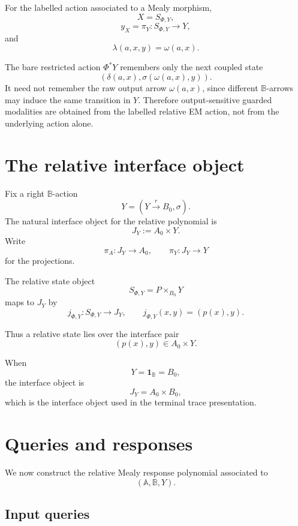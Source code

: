 For the labelled action associated to a Mealy morphism,
\[
X=S_{\Phi,Y},
\]
\[
y_X=\pi_Y:S_{\Phi,Y}\to Y,
\]
and
\[
\lambda(a,x,y)=\omega(a,x).
\]

\begin{remark}
\label{rem:poly-relative-need-labelled-action}
The bare restricted action \(\Phi^\ast Y\) remembers only the next coupled
state
\[
(\delta(a,x),\sigma(\omega(a,x),y)).
\]
It need not remember the raw output arrow \(\omega(a,x)\), since different
\(\mathbb B\)-arrows may induce the same transition in \(Y\).  Therefore
output-sensitive guarded modalities are obtained from the labelled relative
EM action, not from the underlying action alone.
\end{remark}

\section{The relative interface object}
\label{sec:poly-relative-interface-object}

Fix a right \(\mathbb B\)-action
\[
Y=(Y\xrightarrow{r}B_0,\sigma).
\]
The natural interface object for the relative polynomial is
\[
J_Y:=A_0\times Y.
\]
Write
\[
\pi_A:J_Y\to A_0,
\qquad
\pi_Y:J_Y\to Y
\]
for the projections.

The relative state object
\[
S_{\Phi,Y}=P\times_{B_0}Y
\]
maps to \(J_Y\) by
\[
j_{\Phi,Y}:S_{\Phi,Y}\to J_Y,
\qquad
j_{\Phi,Y}(x,y)=(p(x),y).
\]

Thus a relative state lies over the interface pair
\[
(p(x),y)\in A_0\times Y.
\]

\begin{remark}
\label{rem:poly-relative-interface-terminal-specialization}
When
\[
Y=\mathbf 1_{\mathbb B}=B_0,
\]
the interface object is
\[
J_Y=A_0\times B_0,
\]
which is the interface object used in the terminal trace presentation.
\end{remark}

\section{Queries and responses}
\label{sec:poly-relative-queries-responses}

We now construct the relative Mealy response polynomial associated to
\[
(\mathbb A,\mathbb B,Y).
\]

\subsection{Input queries}

